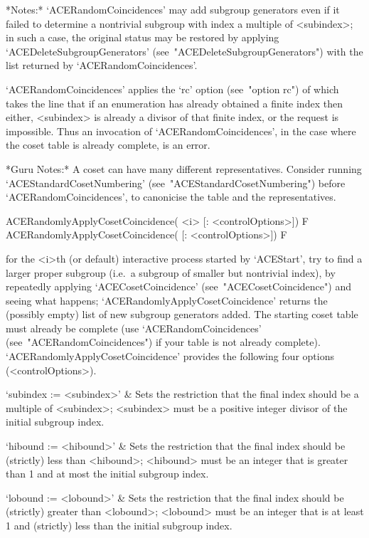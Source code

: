 *Notes:* 
`ACERandomCoincidences' may add subgroup generators even if it  failed
to  determine  a  nontrivial  subgroup  with  index  a   multiple   of
<subindex>; in such a case, the original status  may  be  restored  by
applying                                 `ACEDeleteSubgroupGenerators'
(see~"ACEDeleteSubgroupGenerators")  with   the   list   returned   by
`ACERandomCoincidences'.

`ACERandomCoincidences' applies the `rc' option (see~"option  rc")  of
{\ACE} which takes  the  line  that  if  an  enumeration  has  already
obtained a finite index then either, <subindex> is already  a  divisor
of that finite index, or the request is impossible. Thus an invocation
of `ACERandomCoincidences', in the  case  where  the  coset  table  is
already complete, is an error.

*Guru  Notes:*  A  coset  can  have  many  different  representatives.
Consider              running              `ACEStandardCosetNumbering'
(see~"ACEStandardCosetNumbering") before  `ACERandomCoincidences',  to
canonicise the table and the representatives.

\>ACERandomlyApplyCosetCoincidence( <i> [: <controlOptions>]) F
\>ACERandomlyApplyCosetCoincidence( [: <controlOptions>]) F

for the <i>th (or  default)  interactive  {\ACE}  process  started  by
`ACEStart', try to find a larger proper subgroup (i.e.~a  subgroup  of
smaller   but    nontrivial    index),    by    repeatedly    applying
`ACECosetCoincidence'  (see~"ACECosetCoincidence")  and  seeing   what
happens;  `ACERandomlyApplyCosetCoincidence'  returns  the   (possibly
empty) list of new subgroup generators added. The starting coset table
must    already    be    complete     (use     `ACERandomCoincidences'
(see~"ACERandomCoincidences") if your table is not already  complete).
`ACERandomlyApplyCosetCoincidence' provides the following four options
(<controlOptions>).

\beginitems

\quad`subindex := <subindex>' & 
Sets the restriction that the final index  should  be  a  multiple  of
<subindex>; <subindex> must be  a  positive  integer  divisor  of  the
initial subgroup index.

\quad`hibound := <hibound>' &
Sets the restriction that the final index should  be  (strictly)  less
than <hibound>; <hibound> must be an integer that is  greater  than  1
and at most the initial subgroup index.

\quad`lobound := <lobound>' &
Sets the restriction that the final index should be (strictly) greater
than <lobound>; <lobound> must be an integer that is at  least  1  and
(strictly) less than the initial subgroup index.

